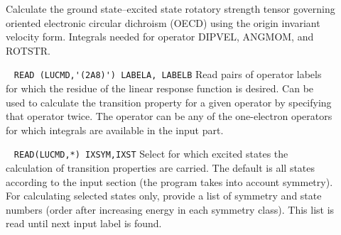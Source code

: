 \begin{description}
\item[] 
%
Calculate the ground state--excited state rotatory strength tensor governing oriented electronic circular dichroism
(OECD) using the origin invariant velocity form.
Integrals needed for operator DIPVEL, ANGMOM, and ROTSTR.

\item[] \verb| |\newline
\verb|READ (LUCMD,'(2A8)') LABELA, LABELB|\newline
%
Read pairs of operator labels for which the residue of the linear response function is desired.
Can be used to calculate the transition property for a given operator
by specifying that operator twice. The operator can be any of the one-electron
operators for which integrals are available in the  input part.

\item[]\verb| |\newline 
\verb|READ(LUCMD,*) IXSYM,IXST|\newline
%
Select for which excited states the calculation of transition properties
are carried. The default is all states according to the  input section
(the program takes into account symmetry). For calculating selected states only,
provide a list of symmetry and state numbers (order after increasing energy in 
each symmetry class). This list is read until next input label is found.

\end{description}
